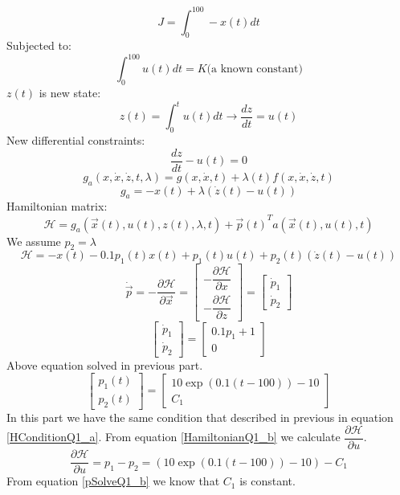 $$J = \int_0^{100}-x(t)dt$$
Subjected to:
$$\int_0^{100}u(t)dt = K\text{(a known constant)}$$
$z(t)$ is new state:
$$z(t) = \int_0^{t}u(t)dt \to \dfrac{dz}{dt} =u(t) $$
New differential constraints:
$$\dfrac{dz}{dt} - u(t) = 0$$
$$g_a(x, \dot x, \dot z, t, \lambda) = g(x, \dot x, t) + \lambda(t)f(x, \dot x, \dot z, t) $$
$$g_a = -x(t) + \lambda (\dot z (t)- u(t))$$
Hamiltonian matrix:
$$\mathcal{H} =  g_a(\vec x(t), u(t), z(t), \lambda,  t) + {\vec{p}(t)}^Ta(\vec x(t), u(t), t)$$
We assume $p_2 = \lambda$
\begin{equation}\label{HamiltonianQ1_b}
\mathcal{H} = -x(t)  -0.1p_1(t)x(t)+p_1(t)u(t) + p_2(t)(\dot z(t)- u(t))
\end{equation}
$$\dot{\vec{p}} = -\dfrac{\partial \mathcal{H} }{\partial \vec x} =  \begin{bmatrix}
	 -\dfrac{\partial \mathcal{H} }{\partial x} \\[10pt]
	 -\dfrac{\partial \mathcal{H} }{\partial z} 
\end{bmatrix} = 
\begin{bmatrix}
	\dot p_1 \\
	\dot p_2
\end{bmatrix}
$$
$$
\begin{bmatrix}
	\dot p_1 \\
	\dot p_2
\end{bmatrix} = \begin{bmatrix}
 0.1p_1+1\\
0
\end{bmatrix}
$$
Above equation solved in previous part.
\begin{equation}\label{pSolveQ1_b}
	\begin{bmatrix}
		p_1(t)\\
		p_2(t)
	\end{bmatrix} = 
	\begin{bmatrix}
		10\exp \left(0.1(t-100)\right)-10\\
		C_1
	\end{bmatrix}
\end{equation}
In this part we have the same condition that described in previous in equation \ref{HConditionQ1_a}.
From equation \ref{HamiltonianQ1_b} we calculate $\dfrac{\partial \mathcal{H}}{\partial u}$.
$$\dfrac{\partial \mathcal{H}}{\partial u} = p_1 - p_2 = \left(10\exp \left(0.1(t-100)\right)-10\right)-C_1$$
From equation \ref{pSolveQ1_b} we know that $C_1$ is constant.


